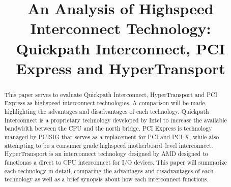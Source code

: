 \documentclass[conference]{IEEEtran}
\begin{document}
%
\title{An Analysis of Highspeed Interconnect Technology: Quickpath
Interconnect, PCI Express and HyperTransport}


\author{
}

\maketitle


\begin{abstract}
\label{sec:abstract}
This paper serves to evaluate Quickpath Interconnect, HyperTransport and PCI
Express as highspeed interconnect technologies. A comparison will be made,
highlighting the advantages and disadvantages of each technology. Quickpath
Interconnect is a proprietary technology developed by Intel to increase the
available bandwidth between the CPU and the north bridge. PCI Express is
technology managed by PCISIG that serves as a replacement for PCI and PCI-X,
while also attempting to be a consumer grade highspeed motherboard--level
interconnect. HyperTransport is an interconnect technology designed by AMD
designed to functionas a direct to CPU interconnect for I/O devices. This paper
will summarize each technology in detail, comparing the advantages and
disadvantages of each technology as well as a brief synopsis about how each
interconnect functions. 
\end{abstract}





%
\IEEEpeerreviewmaketitle
\end{document}
